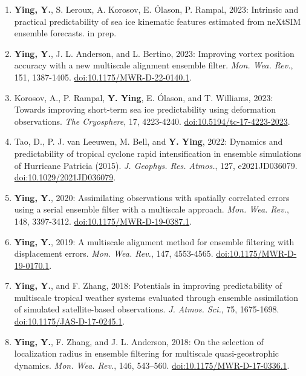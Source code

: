 \begin{enumerate}
\item \textbf{Ying, Y.}, S. Leroux, A. Korosov, E. Ólason, P. Rampal, 2023: Intrinsic and practical predictability of sea ice kinematic features estimated from neXtSIM ensemble forecasts. 
in prep.

\item \textbf{Ying, Y.}, J. L. Anderson, and L. Bertino, 2023: Improving vortex position accuracy with a new multiscale alignment ensemble filter. 
\textit{Mon. Wea. Rev.}, 151, 1387-1405. 
\href{https://doi.org/10.1175/MWR-D-22-0140.1}{doi:10.1175/MWR-D-22-0140.1}.

\item Korosov, A., P. Rampal, \textbf{Y. Ying}, E. Ólason, and T. Williams, 2023: Towards improving short-term sea ice predictability using deformation observations. 
\textit{The Cryosphere}, 17, 4223-4240. 
\href{https://doi.org/10.5194/tc-17-4223-2023}{doi:10.5194/tc-17-4223-2023}.

\item Tao, D., P. J. van Leeuwen, M. Bell, and \textbf{Y. Ying}, 2022: Dynamics and predictability of tropical cyclone rapid intensification in ensemble simulations of Hurricane Patricia (2015). 
\textit{J. Geophys. Res. Atmos.}, 127, e2021JD036079. 
\href{https://doi.org/10.1029/2021JD036079}{doi:10.1029/2021JD036079}.

\item \textbf{Ying, Y.}, 2020: Assimilating observations with spatially correlated errors using a serial ensemble filter with a multiscale approach. 
\textit{Mon. Wea. Rev.}, 148, 3397-3412. 
\href{https://doi.org/10.1175/MWR-D-19-0387.1}{doi:10.1175/MWR-D-19-0387.1}.

\item \textbf{Ying, Y.}, 2019: A multiscale alignment method for ensemble filtering with displacement errors. 
\textit{Mon. Wea. Rev.}, 147, 4553-4565. 
\href{https://doi.org/10.1175/MWR-D-19-0170.1}{doi:10.1175/MWR-D-19-0170.1}.

\item \textbf{Ying, Y.}, and F. Zhang, 2018: Potentials in improving predictability of multiscale tropical weather systems evaluated through ensemble assimilation of simulated satellite-based observations. 
\textit{J. Atmos. Sci.}, 75, 1675-1698. 
\href{https://doi.org/10.1175/JAS-D-17-0245.1}{doi:10.1175/JAS-D-17-0245.1}.

\item \textbf{Ying, Y.}, F. Zhang, and J. L. Anderson, 2018: On the selection of localization radius in ensemble filtering for multiscale quasi-geostrophic dynamics. 
\textit{Mon. Wea. Rev.}, 146, 543–560. 
\href{https://doi.org/10.1175/MWR-D-17-0336.1}{doi:10.1175/MWR-D-17-0336.1}.


\end{enumerate}
